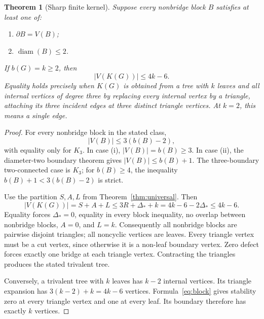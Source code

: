 \documentclass[11pt,a4paper]{article}
\newtheorem{theorem}{Theorem}[section]
\theoremstyle{definition}\newtheorem{definition}[theorem]{Definition}
\theoremstyle{remark}\newtheorem{remark}[theorem]{Remark}
\newcommand{\bd}{\partial}
\newcommand{\diam}{\operatorname{diam}}
\begin{document}
\begin{theorem}[Sharp finite kernel]\label{thm:sharp}
Suppose every nonbridge block $B$ satisfies at least one of:
\begin{enumerate}[label=(\roman*)]
\item $\bd B=V(B)$;
\item $\diam(B)\le2$.
\end{enumerate}
If $b(G)=k\ge2$, then
\begin{equation}\label{eq:sharp}
 |V(K(G))|\le4k-6.
\end{equation}
Equality holds precisely when $K(G)$ is obtained from a tree with $k$ leaves
and all internal vertices of degree three by replacing every internal vertex
by a triangle, attaching its three incident edges at three distinct triangle
vertices. At $k=2$, this means a single edge.
\end{theorem}
\begin{proof}
For every nonbridge block in the stated class,
\begin{equation}\label{eq:efficiency}
 |V(B)|\le3(b(B)-2),
\end{equation}
with equality only for $K_3$. In case (i), $|V(B)|=b(B)\ge3$.
In case (ii), the diameter-two boundary theorem gives $|V(B)|\le b(B)+1$.
The three-boundary two-connected case is $K_3$; for $b(B)\ge4$, the inequality
$b(B)+1<3(b(B)-2)$ is strict.

Use the partition $S,A,L$ from Theorem~\ref{thm:universal}. Then
\[
 |V(K(G))|=S+A+L\le3R+\Delta_*+k
              =4k-6-2\Delta_*\le4k-6.
\]
Equality forces $\Delta_*=0$, equality in every block inequality, no overlap
between nonbridge blocks, $A=0$, and $L=k$. Consequently all nonbridge blocks
are pairwise disjoint triangles; all noncyclic vertices are leaves.
Every triangle vertex must be a cut vertex, since otherwise it is a non-leaf
boundary vertex. Zero defect forces exactly one bridge at each triangle
vertex. Contracting the triangles produces the stated trivalent tree.

Conversely, a trivalent tree with $k$ leaves has $k-2$ internal vertices.
Its triangle expansion has $3(k-2)+k=4k-6$ vertices. Formula~\eqref{eq:block}
gives stability zero at every triangle vertex and one at every leaf.
Its boundary therefore has exactly $k$ vertices.
\end{proof}
\end{document}
